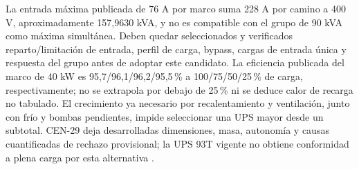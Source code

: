 La entrada máxima publicada de 76 A por marco suma 228 A por camino a 400 V, aproximadamente 157,9630 kVA, y no es compatible con el grupo de 90 kVA como máxima simultánea. Deben quedar seleccionados y verificados reparto/limitación de entrada, perfil de carga, bypass, cargas de entrada única y respuesta del grupo antes de adoptar este candidato. La eficiencia publicada del marco de 40 kW es 95,7/96,1/96,2/95,5\,\% a 100/75/50/25\,\% de carga, respectivamente; no se extrapola por debajo de 25\,\% ni se deduce calor de recarga no tabulado. El crecimiento ya necesario por recalentamiento y ventilación, junto con frío y bombas pendientes, impide seleccionar una UPS mayor desde un subtotal. CEN-29 deja desarrolladas dimensiones, masa, autonomía y causas cuantificadas de rechazo provisional; la UPS 93T vigente no obtiene conformidad a plena carga por esta alternativa \parencite[pp.~2--5]{lote29-93psspec}.

